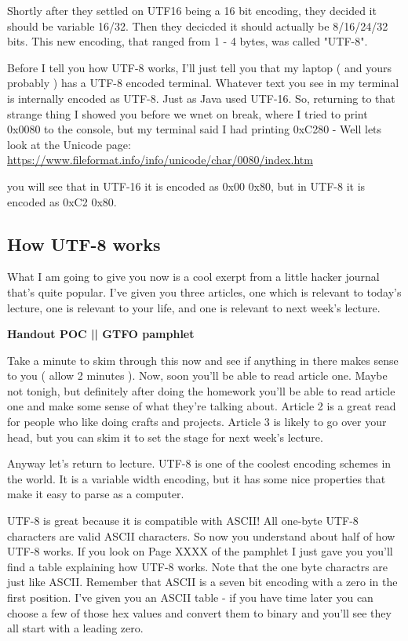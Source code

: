 \documentclass[12pt]{article}
\begin{document}
Shortly after they settled on UTF16 being a 16 bit encoding, they decided it should be variable 16/32. Then they decicded it should actually be 8/16/24/32 bits. This new encoding, that ranged from 1 - 4 bytes, was called "UTF-8". 

Before I tell you how UTF-8 works, I'll just tell  you that my laptop ( and yours probably ) has a UTF-8 encoded terminal. Whatever text you see in my terminal is internally encoded as UTF-8. Just as Java used UTF-16. So, returning to that strange thing I showed you before we wnet on break, where I tried to print 0x0080 to the console, but my terminal said I had printing 0xC280 - Well lets look at the Unicode page:
\url{https://www.fileformat.info/info/unicode/char/0080/index.htm}

you will see that in UTF-16 it is encoded as 0x00 0x80, but in UTF-8 it is encoded as 0xC2 0x80.

\subsection{How UTF-8 works}
What I am going to give you now is a cool exerpt from a little hacker journal that's quite popular. I've given you three articles, one which is relevant to today's lecture, one is relevant to your life, and one is relevant to next week's lecture.

\begin{center}
\textbf{Handout POC || GTFO pamphlet}
\end{center}

Take a minute to skim through this now and see if anything in there makes sense to you ( allow 2 minutes ). Now, soon you'll be able to read article one. Maybe not tonigh, but definitely after doing the homework you'll be able to read article one and make some sense of what they're talking about. Article 2 is a great read for people who like doing crafts and projects. Article 3 is likely to go over your head, but you can skim it to set the stage for next week's lecture.

Anyway let's return to lecture. UTF-8 is one of the coolest encoding schemes in the world. It is a variable width encoding, but it has some nice properties that make it easy to parse as a computer.

UTF-8 is great because it is compatible with ASCII! All one-byte UTF-8 characters are valid ASCII characters. So now you understand about half of how UTF-8 works. If you look on Page XXXX of the pamphlet I just gave you you'll find a table explaining how UTF-8 works. Note that the one byte charactrs are just like ASCII. Remember that ASCII is a seven bit encoding with a zero in the first position. I've given you an ASCII table - if you have time later you can choose a few of those hex values and convert them to binary and you'll see they all start with a leading zero.
\end{document}
